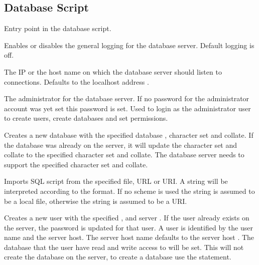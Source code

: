 \subsection{Database Script}



Entry point in the database script.


Enables or disables the general logging for the database server.
Default logging is off.


The IP  or the host name on which the database server should listen
to connections. Defaults to the localhost address .


The administrator  for the database server. If no password for
the administrator account was yet set this password is set. Used to login as
the administrator user to create users, create databases and set permissions.


Creates a new database with the specified database , character set and collate.
If the database was already on the server, it will update the character set and collate
to the specified character set and collate. The database server needs to support 
the specified character set and collate.


Imports SQL script  from the specified file, URL or URI. 
A string will be interpreted according to the format. If no scheme is used 
the string is assumed to be a local file, otherwise the string is assumed to 
be a URI.


Creates a new user with the specified ,  and server .
If the user already exists on the server, the password is updated for that user.
A user is identified by the user name and the server host.
The server host name defaults to the server host .
The database that the user have read and write access to will be set. This will not create
the database on the server, to create a database use the  statement.
